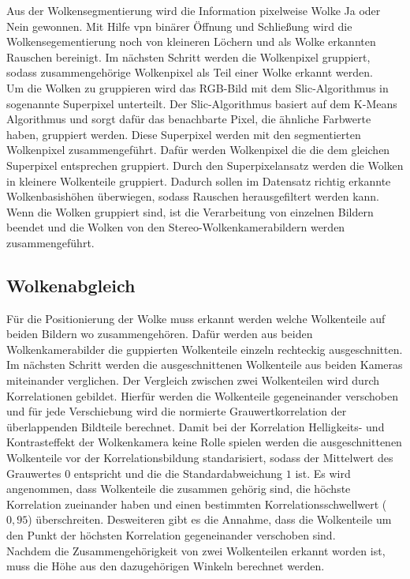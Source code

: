 \documentclass[a4paper,11pt,twoside,german]{article}
\begin{document}
Aus der Wolkensegmentierung wird die Information pixelweise Wolke Ja oder Nein gewonnen. Mit Hilfe vpn binärer Öffnung und Schließung wird die Wolkensegementierung noch von kleineren Löchern und als Wolke erkannten Rauschen bereinigt. Im nächsten Schritt werden die Wolkenpixel gruppiert, sodass zusammengehörige Wolkenpixel als Teil einer Wolke erkannt werden.\\
Um die Wolken zu gruppieren wird das RGB-Bild mit dem Slic-Algorithmus in sogenannte Superpixel unterteilt. Der Slic-Algorithmus basiert auf dem K-Means Algorithmus und sorgt dafür das benachbarte Pixel, die ähnliche Farbwerte haben, gruppiert werden. Diese Superpixel werden mit den segmentierten Wolkenpixel zusammengeführt. Dafür werden Wolkenpixel die die dem gleichen Superpixel entsprechen gruppiert. Durch den Superpixelansatz werden die Wolken in kleinere Wolkenteile gruppiert. Dadurch sollen im Datensatz richtig erkannte Wolkenbasishöhen überwiegen, sodass Rauschen herausgefiltert werden kann.\\

Wenn die Wolken gruppiert sind, ist die Verarbeitung von einzelnen Bildern beendet und die Wolken von den Stereo-Wolkenkamerabildern werden zusammengeführt.
\subsection{Wolkenabgleich}
Für die Positionierung der Wolke muss erkannt werden welche Wolkenteile auf beiden Bildern wo zusammengehören. Dafür werden aus beiden Wolkenkamerabilder die guppierten Wolkenteile einzeln rechteckig ausgeschnitten.\\
Im nächsten Schritt werden die ausgeschnittenen Wolkenteile aus beiden Kameras miteinander verglichen. Der Vergleich zwischen zwei Wolkenteilen wird durch Korrelationen gebildet. Hierfür werden die Wolkenteile gegeneinander verschoben und für jede Verschiebung wird die normierte Grauwertkorrelation der überlappenden Bildteile berechnet. Damit bei der Korrelation Helligkeits- und Kontrasteffekt der Wolkenkamera keine Rolle spielen werden die ausgeschnittenen Wolkenteile vor der Korrelationsbildung standarisiert, sodass der Mittelwert des Grauwertes $0$ entspricht und die die Standardabweichung $1$ ist. Es wird angenommen, dass Wolkenteile die zusammen gehörig sind, die höchste Korrelation zueinander haben und einen bestimmten Korrelationsschwellwert ($0,95$) überschreiten. Desweiteren gibt es die Annahme, dass die Wolkenteile um den Punkt der höchsten Korrelation gegeneinander verschoben sind.\\
Nachdem die Zusammengehörigkeit von zwei Wolkenteilen erkannt worden ist, muss die Höhe aus den dazugehörigen Winkeln berechnet werden.
\end{document}
